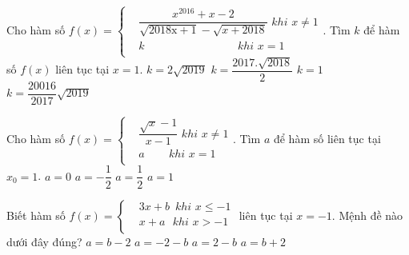 \begin{ex}%
	
	Cho hàm số $f\left( x \right)=\left\{ \begin{aligned}
		& \dfrac{{x^{2016}}+x-2}{\sqrt{2018\text{x}+1}-\sqrt{x+2018}}\,\,khi\,\,x\ne 1 \\
		& k\,\,\,\,\,\,\,\,\,\,\,\,\,\,\,\,\,\,\,\,\,\,\,\,\,\,\,\,\,\,\,\,\,\,\,\,\,\,\,\,\,\,\,\,\,\,\,\,\,\,khi\,\,x=1 \\
	\end{aligned} \right.$. Tìm $k$ để hàm số $f\left( x \right)$ liên tục tại $x=1$.
	\choice
	{\True $k=2\sqrt{2019}$}
	{ $k=\dfrac{2017.\sqrt{2018}}{2}$}
	{ $k=1$}
	{ $k=\dfrac{20016}{2017}\sqrt{2019}$}
\end{ex}
\begin{ex}%
	
	Cho hàm số $f\left( x \right)=\left\{ \begin{aligned}
		& \dfrac{\sqrt{x}-1}{x-1}\,\,khi\,\,x\ne 1 \\
		& a\,\,\,\,\,\,\,\,\,\,\,\,\,khi\,\,x=1 \\
	\end{aligned} \right.$. Tìm $a$ để hàm số liên tục tại $x_0=1$.
	\choice
	{ $a=0$}
	{ $a=-\dfrac{1}{2}$}
	{\True $a=\dfrac{1}{2}$}
	{ $a=1$}
\end{ex}
\begin{ex}%
	
	Biết hàm số $f\left( x \right)=\left\{ \begin{aligned}
		& 3x+b\,\,\,khi\,\,x\le -1 \\
		& x+a\,\,\,\,khi\,\,x>-1 \\
	\end{aligned} \right.$ liên tục tại $x=-1$. Mệnh đề nào dưới đây đúng?
	\choice
	{\True $a=b-2$}
	{ $a=-2-b$}
	{ $a=2-b$}
	{ $a=b+2$}
\end{ex}
